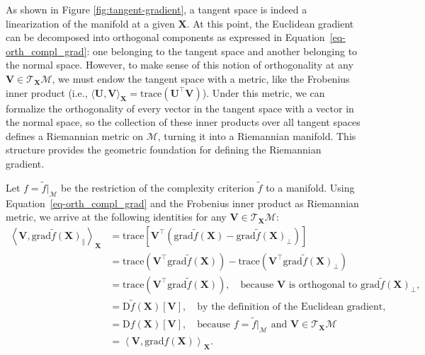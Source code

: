 \documentclass[
  12pt,
  letterpaper,
  article]{scrartcl}
\begin{document}
As shown in Figure \ref{fig:tangent-gradient}, a tangent space is indeed
a linearization of the manifold at a given \(\mathbf{X}\). At this
point, the Euclidean gradient can be decomposed into orthogonal
components as expressed in Equation~\ref{eq-orth_compl_grad}: one
belonging to the tangent space and another belonging to the normal
space. However, to make sense of this notion of orthogonality at any
\(\mathbf{V} \in \mathcal{T}_{\mathbf{X}}\mathcal{M}\), we must endow
the tangent space with a metric, like the Frobenius inner product (i.e.,
\(\langle \mathbf{U},\mathbf{V}\rangle_{\mathbf{X}} = \mathrm{trace}(\mathbf{U}^\top\mathbf{V})\)).
Under this metric, we can formalize the orthogonality of every vector in
the tangent space with a vector in the normal space, so the collection
of these inner products over all tangent spaces defines a Riemannian
metric on \(\mathcal{M}\), turning it into a Riemannian manifold. This
structure provides the geometric foundation for defining the Riemannian
gradient.

Let \(f=\tilde{f}|_{\mathcal{M}}\) be the restriction of the complexity
criterion \(\tilde{f}\) to a manifold. Using
Equation~\ref{eq-orth_compl_grad} and the Frobenius inner product as
Riemannian metric, we arrive at the following identities for any
\(\mathbf{V} \in \mathcal{T}_\mathbf{X}\mathcal{M}\): \[
\begin{aligned}
\left\langle
\mathbf{V},
\text{grad}\tilde{f}(\mathbf{X})_\parallel
\right\rangle_{\mathbf{X}}
&=
\mathrm{trace}\left[
\mathbf{V}^\top
\left(
\text{grad}\tilde{f}(\mathbf{X})
-
\text{grad}\tilde{f}(\mathbf{X})_\perp
\right)
\right]
\\
&=
\mathrm{trace}\left(
\mathbf{V}^\top
\text{grad}\tilde{f}(\mathbf{X})
\right)
-
\mathrm{trace}\left(
\mathbf{V}^\top
\text{grad}\tilde{f}(\mathbf{X})_\perp
\right)
\\
&=
\mathrm{trace}\left(
\mathbf{V}^\top
\text{grad}\tilde{f}(\mathbf{X})
\right),
\quad
\text{because }
\mathbf{V}
\text{ is orthogonal to }
\text{grad}\tilde{f}(\mathbf{X})_\perp,
\\
&=
\mathrm{D}\tilde{f}(\mathbf{X})[\mathbf{V}],
\quad
\text{by the definition of the Euclidean gradient},
\\
&=
\mathrm{D}f(\mathbf{X})[\mathbf{V}],
\quad
\text{because }
f=\tilde{f}|_{\mathcal{M}}
\text{ and }
\mathbf{V}\in\mathcal{T}_{\mathbf{X}}\mathcal{M} \\
&= \left\langle
\mathbf{V},
\text{grad}f(\mathbf{X})
\right\rangle_{\mathbf{X}}.
\end{aligned}
\]
\end{document}
